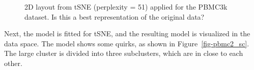 \documentclass[
  12pt]{article}
\begin{document}
\begin{figure}[H]


\caption{\label{fig-tsnesuggest}2D layout from tSNE (perplexity = 51)
applied for the PBMC3k dataset. Is this a best representation of the
original data?}

\end{figure}%

Next, the model is fitted for tSNE, and the resulting model is
visualized in the data space. The model shows some quirks, as shown in
Figure~\ref{fig-pbmc2_sc}. The large cluster is divided into three
subclusters, which are in close to each other.
\end{document}

